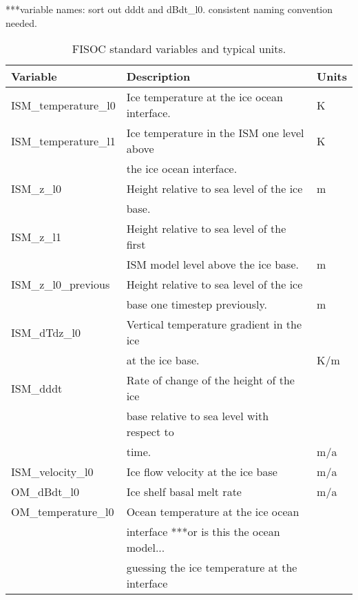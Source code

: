 \documentclass[12pt]{article}
\begin{document}
***variable names: sort out dddt and dBdt\_l0.  consistent naming convention needed.

\begin{table}
\begin{center}
\begin{tabular}{ l|l|l }
Variable              & Description                                  & Units \\
\hline
ISM\_temperature\_l0  & Ice temperature at the ice ocean interface.  & K \\
ISM\_temperature\_l1  & Ice temperature in the ISM one level above   & K \\
                      & the ice ocean interface.                     &   \\ 
ISM\_z\_l0            & Height relative to sea level of the ice      & m \\
                      & base.                                        &   \\
ISM\_z\_l1            & Height relative to sea level of the first    &   \\
                      & ISM model level above the ice base.          & m \\
ISM\_z\_l0\_previous  & Height relative to sea level of the ice      &   \\
                      & base one timestep previously.                & m \\
ISM\_dTdz\_l0         & Vertical temperature gradient in the ice     &   \\
                      & at the ice base.                             & K/m \\
ISM\_dddt             & Rate of change of the height of the ice      &   \\
                      & base relative to sea level with respect to   &   \\
                      & time.                                        & m/a \\
ISM\_velocity\_l0     & Ice flow velocity at the ice base            & m/a \\
OM\_dBdt\_l0          & Ice shelf basal melt rate                    & m/a \\
OM\_temperature\_l0   & Ocean temperature at the ice ocean           &   \\
                      & interface  ***or is this the ocean model...  &   \\
                      & guessing the ice temperature at the interface&   \\
\end{tabular}
\end{center}
\caption{FISOC standard variables and typical units.}
\label{tab:vars}
\end{table}
\end{document}
